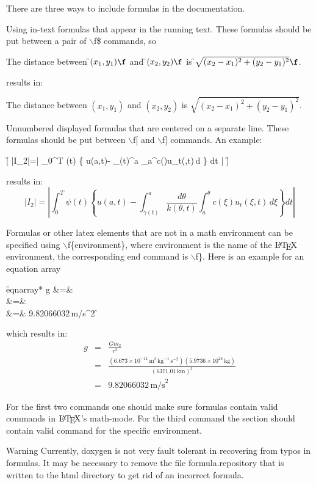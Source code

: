 There are three ways to include formulas in the documentation. 
\begin{DoxyEnumerate}
\item Using in-\/text formulas that appear in the running text. These formulas should be put between a pair of $\backslash$f\$ commands, so \begin{DoxyVerb}
  The distance between \f$(x_1,y_1)\f$ and \f$(x_2,y_2)\f$ is 
  \f$\sqrt{(x_2-x_1)^2+(y_2-y_1)^2}\f$.
\end{DoxyVerb}
 results in:

The distance between $(x_1,y_1)$ and $(x_2,y_2)$ is $\sqrt{(x_2-x_1)^2+(y_2-y_1)^2}$. \par
 
\item Unnumbered displayed formulas that are centered on a separate line. These formulas should be put between $\backslash$f\mbox{[} and $\backslash$f\mbox{]} commands. An example: \begin{DoxyVerb}
  \f[
    |I_2|=\left| \int_{0}^T \psi(t) 
             \left\{ 
                u(a,t)-
                \int_{\gamma(t)}^a 
                \int_{a}^\theta c(\xi)u_t(\xi,t)\,d\xi
             \right\} dt
          \right|
  \f]
\end{DoxyVerb}
 results in: \[ |I_2|=\left| \int_{0}^T \psi(t) \left\{ u(a,t)- \int_{\gamma(t)}^a \frac{d\theta}{k(\theta,t)} \int_{a}^\theta c(\xi)u_t(\xi,t)\,d\xi \right\} dt \right| \] 
\item Formulas or other latex elements that are not in a math environment can be specified using $\backslash$f\{environment\}, where {\ttfamily environment} is the name of the $\mbox{\LaTeX}$ environment, the corresponding end command is $\backslash$f\}. Here is an example for an equation array \begin{DoxyVerb}
   \f{eqnarray*}{
        g &=&  \\ 
          &=&  \\ 
          &=& 9.82066032\,\mbox{m/s}^2
   \f}
\end{DoxyVerb}
 which results in: \begin{eqnarray*} g &=& \frac{Gm_2}{r^2} \\ &=& \frac{(6.673 \times 10^{-11}\,\mbox{m}^3\,\mbox{kg}^{-1}\, \mbox{s}^{-2})(5.9736 \times 10^{24}\,\mbox{kg})}{(6371.01\,\mbox{km})^2} \\ &=& 9.82066032\,\mbox{m/s}^2 \end{eqnarray*} 
\end{DoxyEnumerate}For the first two commands one should make sure formulas contain valid commands in $\mbox{\LaTeX}$'s math-\/mode. For the third command the section should contain valid command for the specific environment.

\begin{DoxyWarning}{Warning}
Currently, doxygen is not very fault tolerant in recovering from typos in formulas. It may be necessary to remove the file {\ttfamily formula.repository} that is written to the html directory to get rid of an incorrect formula.
\end{DoxyWarning}
 